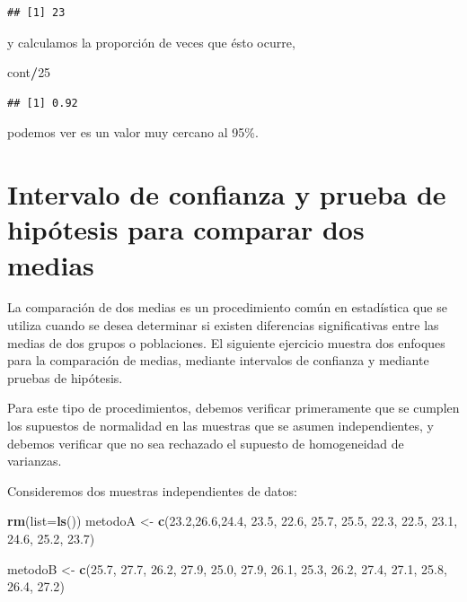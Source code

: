 \documentclass[
]{book}
\newenvironment{Shaded}{\begin{snugshade}}{\end{snugshade}}
\newcommand{\AttributeTok}[1]{\textcolor[rgb]{0.13,0.29,0.53}{#1}}
\newcommand{\DecValTok}[1]{\textcolor[rgb]{0.00,0.00,0.81}{#1}}
\newcommand{\FloatTok}[1]{\textcolor[rgb]{0.00,0.00,0.81}{#1}}
\newcommand{\FunctionTok}[1]{\textcolor[rgb]{0.13,0.29,0.53}{\textbf{#1}}}
\newcommand{\NormalTok}[1]{#1}
\newcommand{\OtherTok}[1]{\textcolor[rgb]{0.56,0.35,0.01}{#1}}
\newcommand{\SpecialCharTok}[1]{\textcolor[rgb]{0.81,0.36,0.00}{\textbf{#1}}}
\begin{document}
\begin{verbatim}
## [1] 23
\end{verbatim}

y calculamos la proporción de veces que ésto ocurre,

\begin{Shaded}
\begin{Highlighting}[]
\NormalTok{cont}\SpecialCharTok{/}\DecValTok{25}
\end{Highlighting}
\end{Shaded}

\begin{verbatim}
## [1] 0.92
\end{verbatim}

podemos ver es un valor muy cercano al 95\%.

\hypertarget{intervalo-de-confianza-y-prueba-de-hipuxf3tesis-para-comparar-dos-medias}{%
\chapter{Intervalo de confianza y prueba de hipótesis para comparar dos medias}\label{intervalo-de-confianza-y-prueba-de-hipuxf3tesis-para-comparar-dos-medias}}

La comparación de dos medias es un procedimiento común en estadística que se utiliza cuando se desea determinar si existen diferencias significativas entre las medias de dos grupos o poblaciones. El siguiente ejercicio muestra dos enfoques para la comparación de medias, mediante intervalos de confianza y mediante pruebas de hipótesis.

Para este tipo de procedimientos, debemos verificar primeramente que se cumplen los supuestos de normalidad en las muestras que se asumen independientes, y debemos verificar que no sea rechazado el supuesto de homogeneidad de varianzas.

Consideremos dos muestras independientes de datos:

\begin{Shaded}
\begin{Highlighting}[]
\FunctionTok{rm}\NormalTok{(}\AttributeTok{list=}\FunctionTok{ls}\NormalTok{())}
\NormalTok{metodoA }\OtherTok{\textless{}{-}} \FunctionTok{c}\NormalTok{(}\FloatTok{23.2}\NormalTok{,}\FloatTok{26.6}\NormalTok{,}\FloatTok{24.4}\NormalTok{, }\FloatTok{23.5}\NormalTok{, }\FloatTok{22.6}\NormalTok{, }\FloatTok{25.7}\NormalTok{, }\FloatTok{25.5}\NormalTok{, }\FloatTok{22.3}\NormalTok{, }
             \FloatTok{22.5}\NormalTok{, }\FloatTok{23.1}\NormalTok{, }\FloatTok{24.6}\NormalTok{, }\FloatTok{25.2}\NormalTok{, }\FloatTok{23.7}\NormalTok{)}

\NormalTok{metodoB }\OtherTok{\textless{}{-}} \FunctionTok{c}\NormalTok{(}\FloatTok{25.7}\NormalTok{, }\FloatTok{27.7}\NormalTok{, }\FloatTok{26.2}\NormalTok{, }\FloatTok{27.9}\NormalTok{, }\FloatTok{25.0}\NormalTok{, }\FloatTok{27.9}\NormalTok{, }\FloatTok{26.1}\NormalTok{, }\FloatTok{25.3}\NormalTok{, }
             \FloatTok{26.2}\NormalTok{, }\FloatTok{27.4}\NormalTok{, }\FloatTok{27.1}\NormalTok{, }\FloatTok{25.8}\NormalTok{, }\FloatTok{26.4}\NormalTok{, }\FloatTok{27.2}\NormalTok{)}
\end{Highlighting}
\end{Shaded}
\end{document}
